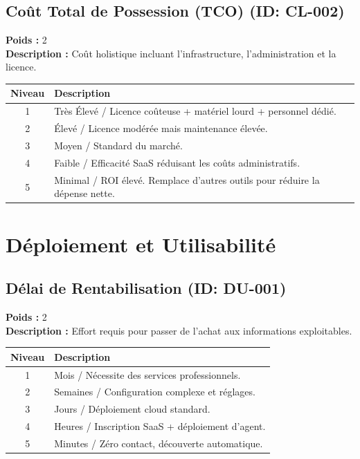 \documentclass{article}
\begin{document}
\subsection{Coût Total de Possession (TCO) (ID: CL-002)}
\textbf{Poids :} 2 \\
\textbf{Description :} Coût holistique incluant l'infrastructure, l'administration et la licence.
\vspace{0.3cm}
\begin{longtable}{|c|p{12cm}|}
\hline
\rowcolor{lightgray} \textbf{Niveau} & \textbf{Description} \\ \hline
1 & Très Élevé / Licence coûteuse + matériel lourd + personnel dédié. \\ \hline
2 & Élevé / Licence modérée mais maintenance élevée. \\ \hline
3 & Moyen / Standard du marché. \\ \hline
4 & Faible / Efficacité SaaS réduisant les coûts administratifs. \\ \hline
5 & Minimal / ROI élevé. Remplace d'autres outils pour réduire la dépense nette. \\ \hline
\end{longtable}
\vspace{0.5cm}
\section{Déploiement et Utilisabilité}
\subsection{Délai de Rentabilisation (ID: DU-001)}
\textbf{Poids :} 2 \\
\textbf{Description :} Effort requis pour passer de l'achat aux informations exploitables.
\vspace{0.3cm}
\begin{longtable}{|c|p{12cm}|}
\hline
\rowcolor{lightgray} \textbf{Niveau} & \textbf{Description} \\ \hline
1 & Mois / Nécessite des services professionnels. \\ \hline
2 & Semaines / Configuration complexe et réglages. \\ \hline
3 & Jours / Déploiement cloud standard. \\ \hline
4 & Heures / Inscription SaaS + déploiement d'agent. \\ \hline
5 & Minutes / Zéro contact, découverte automatique. \\ \hline
\end{longtable}
\vspace{0.5cm}
\end{document}

